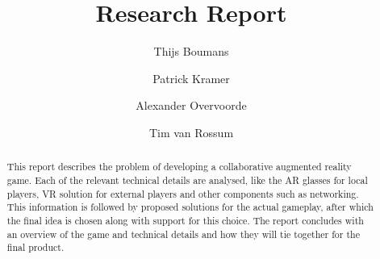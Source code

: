 \documentclass{report}
\title{Research Report}
\author{Thijs Boumans \and Patrick Kramer \and 
        Alexander Overvoorde \and Tim van Rossum}
\begin{document}
\maketitle

\begin{abstract}
	This report describes the problem of developing a collaborative augmented
	reality game. Each of the relevant technical details are analysed, like the
	AR glasses for local players, VR solution for external players and other
	components such as networking. This information is followed by proposed
	solutions for the actual gameplay, after which the final idea is chosen
	along with support for this choice. The report concludes with an overview
	of the game and technical details and how they will tie together for the
	final product.
\end{abstract}

\tableofcontents






\pagebreak %

\end{document}
